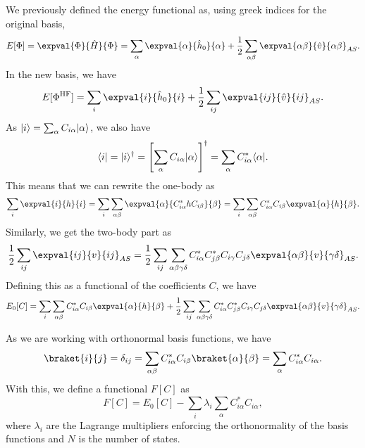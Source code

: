 \subsection{}
We previously defined the energy functional as, using greek indices for the original basis,
\begin{equation*}
    E[\Phi] = \expval{\Phi}{\hat{H}}{\Phi} = \sum_{\alpha} \expval{\alpha}{\hat{h}_0}{\alpha} + \frac{1}{2} \sum_{\alpha\beta} \expval{\alpha\beta}{\hat{v}}{\alpha \beta}_{AS}.
\end{equation*}
In the new basis, we have
\begin{equation*}
    E[\Phi^\HF] = \sum_{i} \expval{i}{\hat{h}_0}{i} + \frac{1}{2} \sum_{ij} \expval{ij}{\hat{v}}{ij}_{AS}.
\end{equation*}
As $\lvert i\rangle = \sum_{\alpha} C_{i \alpha} \lvert\alpha\rangle$, we also have
\begin{equation*}
    \langle i\rvert = \lvert i\rangle^\dagger
    = \left[ \sum_{\alpha} C_{i \alpha} \lvert\alpha\rangle \right]^\dagger
    = \sum_{\alpha} C_{i \alpha}^* \langle\alpha\rvert.
\end{equation*}
This means that we can rewrite the one-body as
\begin{align*}
    \sum_i \expval{i}{h}{i} = \sum_{i} \sum_{\alpha\beta} \expval{\alpha}{C_{i \alpha}^* h C_{i \beta}}{\beta} = \sum_{i} \sum_{\alpha\beta} C_{i \alpha}^* C_{i \beta}  \expval{\alpha}{h}{\beta}.
\end{align*}
Similarly, we get the two-body part as
\begin{equation*}
    \frac{1}{2} \sum_{ij} \expval{ij}{v}{ij}_{AS} = \frac{1}{2} \sum_{ij} \sum_{\alpha\beta\gamma\delta} C_{i \alpha}^* C_{j \beta}^* C_{i \gamma} C_{j \delta} \expval{\alpha\beta}{v}{\gamma\delta}_{AS}.
\end{equation*}
Defining this as a functional of the coefficients $C$, we have
\begin{equation}\label{eq:E0}
    E_0[C] = \sum_{i} \sum_{\alpha\beta} C_{i \alpha}^* C_{i \beta}  \expval{\alpha}{h}{\beta} + \frac{1}{2} \sum_{ij} \sum_{\alpha\beta\gamma\delta} C_{i \alpha}^* C_{j \beta}^* C_{i \gamma} C_{j \delta} \expval{\alpha\beta}{v}{\gamma\delta}_{AS}.
\end{equation}

As we are working with orthonormal basis functions, we have
\begin{equation*}
    \braket{i}{j} = \delta_{ij} = \sum_{\alpha\beta} C_{i \alpha}^* C_{i \beta} \braket{\alpha}{\beta} = \sum_{\alpha} C_{i \alpha}^* C_{i \alpha}.
\end{equation*}
With this, we define a functional $F[C]$ as
\begin{equation*}
    F[C] = E_0[C] - \sum_{i} \lambda_i \sum_{\alpha} C_{i \alpha}^* C_{i \alpha},
\end{equation*}
where $\lambda_i$ are the Lagrange multipliers enforcing the orthonormality of the basis functions and $N$ is the number of states.

